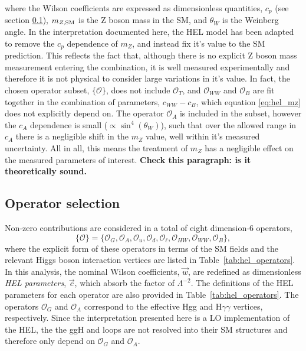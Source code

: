 \noindent
where the Wilson coefficients are expressed as dimensionless quantities, $c_p$ (see section \ref{sec:eft_operator}), $m_{Z,\rm{SM}}$ is the Z boson mass in the SM, and $\theta_W$ is the Weinberg angle. In the interpretation documented here, the HEL model has been adapted to remove the $c_p$ dependence of $m_Z$, and instead fix it's value to the SM prediction. This reflects the fact that, although there is no explicit Z boson mass measurement entering the combination, it is well measured experimentally and therefore it is not physical to consider large variations in it's value. In fact, the chosen operator subset, $\{\mathcal{O}\}$, does not include $\mathcal{O}_T$, and $\mathcal{O}_{WW}$ and $\mathcal{O}_B$ are fit together in the combination of parameters, $c_{WW}-c_B$, which equation \ref{eq:hel_mz} does not explicitly depend on. The operator $\mathcal{O}_A$ is included in the subset, however the $c_A$ dependence is small ($\propto \sin^4(\theta_W)$), such that over the allowed range in $c_A$ there is a negligible shift in the $m_Z$ value, well within it's measured uncertainty. All in all, this means the treatment of $m_Z$ has a negligible effect on the measured parameters of interest. \textbf{Check this paragraph: is it theoretically sound.}

\subsection{Operator selection}\label{sec:eft_operator}
Non-zero contributions are considered in a total of eight dimension-6 operators,
\begin{equation}
    \{\mathcal{O}\} = \{\mathcal{O}_G,\mathcal{O}_A,\mathcal{O}_u,\mathcal{O}_d,\mathcal{O}_\ell,\mathcal{O}_{HW},\mathcal{O}_{WW},\mathcal{O}_B\},
\end{equation}
\noindent
where the explicit form of these operators in terms of the SM fields and the relevant Higgs boson interaction vertices are listed in Table~\ref{tab:hel_operators}. In this analysis, the nominal Wilson coefficients, $\vec{w}$, are redefined as dimensionless \textit{HEL parameters}, $\vec{c}$, which absorb the factor of $\Lambda^{-2}$. The definitions of the HEL parameters for each operator are also provided in Table~\ref{tab:hel_operators}. The operators $\mathcal{O}_G$ and $\mathcal{O}_A$ correspond to the effective Hgg and H$\gamma\gamma$ vertices, respectively. Since the interpretation presented here is a LO implementation of the HEL, the the ggH and \Hgg loops are not resolved into their SM structures and therefore only depend on $\mathcal{O}_G$ and $\mathcal{O}_A$.


